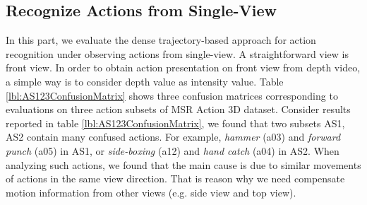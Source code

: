 \documentclass[final,3p,times,twocolumn]{elsarticle}
\begin{document}
\subsection{Recognize Actions from Single-View}

In this part, we evaluate the dense trajectory-based approach for action recognition under observing actions from single-view.
A straightforward view is front view.
In order to obtain action presentation on front view from depth video, a simple way is to consider depth value as intensity value.
Table \ref{lbl:AS123ConfusionMatrix} shows three confusion matrices corresponding to evaluations on three action subsets of MSR Action 3D dataset.
Consider results reported in table \ref{lbl:AS123ConfusionMatrix}, we found that two subsets AS1, AS2 contain many confused actions. For example, \textit{hammer} (a03) and \textit{forward punch} (a05) in AS1, or \textit{side-boxing} (a12) and \textit{hand catch} (a04) in AS2.
When analyzing such actions, we found that the main cause is due to similar movements of actions in the same view direction.
That is reason why we need compensate motion information from other views (e.g. side view and top view).
\end{document}
